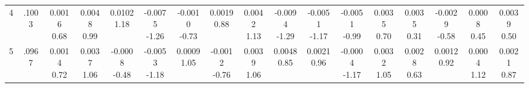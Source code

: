 \begin{landscape}
\begin{center}
{\begin{adjustbox}{max width=\textheight}
\begin{tabular}{lcccccccccccccccc}
4 & .1003 & \shortstack{0.0016\\0.68} & \shortstack{0.0048\\0.99} & \shortstack{0.0102\\1.18} & \shortstack{-0.0075\\-1.26} & \shortstack{-0.0010\\-0.73} & \shortstack{0.0019\\0.88} & \shortstack{0.0042\\1.13} & \shortstack{-0.0094\\-1.29} & \shortstack{-0.0051\\-1.17} & \shortstack{-0.0051\\-0.99} & \shortstack{0.0035\\0.70} & \shortstack{0.0035\\0.31} & \shortstack{-0.0029\\-0.58} & \shortstack{0.0008\\0.45} & \shortstack{0.0039\\0.50} \\
5 & .0967 & \shortstack{0.0014\\0.72} & \shortstack{0.0037\\1.06} & \shortstack{-0.0008\\-0.48} & \shortstack{-0.0053\\-1.18} & \shortstack{0.0009\\1.05} & \shortstack{-0.0012\\-0.76} & \shortstack{0.0039\\1.06} & \shortstack{0.0048\\0.85} & \shortstack{0.0021\\0.96} & \shortstack{-0.0004\\-1.17} & \shortstack{0.0032\\1.05} & \shortstack{0.0028\\0.63} & \shortstack{0.0012\\0.92} & \shortstack{0.0004\\1.12} & \shortstack{0.0021\\0.87} \\

\end{tabular}
\end{adjustbox}}
\end{center}
\end{landscape}
